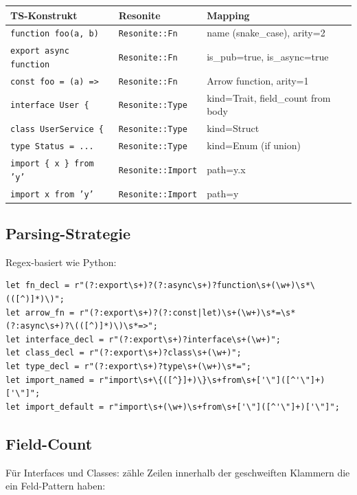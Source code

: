 \documentclass[11pt,a4paper]{article}
\begin{document}
\begin{longtable}{lp{4cm}p{5cm}}
\toprule
\textbf{TS-Konstrukt} & \textbf{Resonite} & \textbf{Mapping} \\
\midrule
\texttt{function foo(a, b)}
  & \texttt{Resonite::Fn}
  & name (snake\_case), arity=2 \\
\texttt{export async function}
  & \texttt{Resonite::Fn}
  & is\_pub=true, is\_async=true \\
\texttt{const foo = (a) =>}
  & \texttt{Resonite::Fn}
  & Arrow function, arity=1 \\
\texttt{interface User \{}
  & \texttt{Resonite::Type}
  & kind=Trait, field\_count from body \\
\texttt{class UserService \{}
  & \texttt{Resonite::Type}
  & kind=Struct \\
\texttt{type Status = ...}
  & \texttt{Resonite::Type}
  & kind=Enum (if union) \\
\texttt{import \{ x \} from 'y'}
  & \texttt{Resonite::Import}
  & path=y.x \\
\texttt{import x from 'y'}
  & \texttt{Resonite::Import}
  & path=y \\
\bottomrule
\end{longtable}

\subsection{Parsing-Strategie}

Regex-basiert wie Python:

\begin{lstlisting}[style=rust]
let fn_decl = r"(?:export\s+)?(?:async\s+)?function\s+(\w+)\s*\(([^)]*)\)";
let arrow_fn = r"(?:export\s+)?(?:const|let)\s+(\w+)\s*=\s*(?:async\s+)?\(([^)]*)\)\s*=>";
let interface_decl = r"(?:export\s+)?interface\s+(\w+)";
let class_decl = r"(?:export\s+)?class\s+(\w+)";
let type_decl = r"(?:export\s+)?type\s+(\w+)\s*=";
let import_named = r"import\s+\{([^}]+)\}\s+from\s+['\"]([^'\"]+)['\"]";
let import_default = r"import\s+(\w+)\s+from\s+['\"]([^'\"]+)['\"]";
\end{lstlisting}

\subsection{Field-Count}

F\"ur Interfaces und Classes: z\"ahle Zeilen innerhalb 
der geschweiften Klammern die ein Feld-Pattern haben:
\end{document}
